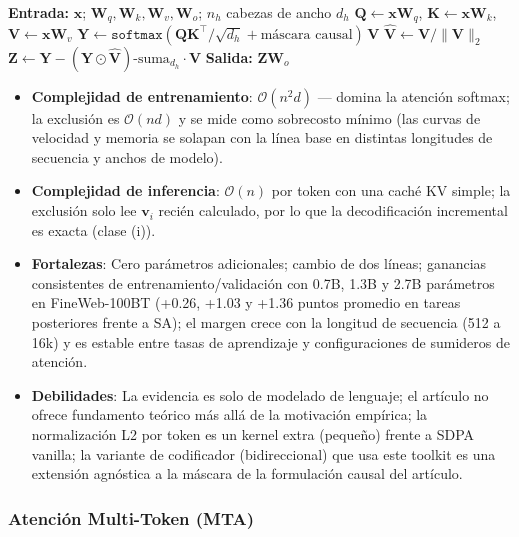 \begin{algorithmic}[1]
\State \textbf{Entrada:} $\mathbf{x}$; $\mathbf{W}_q,\mathbf{W}_k,\mathbf{W}_v,\mathbf{W}_o$; $n_h$ cabezas de ancho $d_h$
\State $\mathbf{Q}\gets\mathbf{x}\mathbf{W}_q$, $\mathbf{K}\gets\mathbf{x}\mathbf{W}_k$, $\mathbf{V}\gets\mathbf{x}\mathbf{W}_v$ 
\State $\mathbf{Y} \gets \texttt{softmax}(\mathbf{Q}\mathbf{K}^\top/\sqrt{d_h} + \text{máscara causal})\,\mathbf{V}$ 
\State $\hat{\mathbf{V}} \gets \mathbf{V} / \|\mathbf{V}\|_2$ 
\State $\mathbf{Z} \gets \mathbf{Y} - (\mathbf{Y}\odot\hat{\mathbf{V}})\text{-suma}_{d_h}\cdot\hat{\mathbf{V}}$ 
\State \textbf{Salida:} $\mathbf{Z}\mathbf{W}_o$
\end{algorithmic}

\begin{itemize}[leftmargin=*]
    \item \textbf{Complejidad de entrenamiento}: $\mathcal{O}(n^2 d)$ --- domina la atención softmax; la exclusión es $\mathcal{O}(nd)$ y se mide como sobrecosto mínimo (las curvas de velocidad y memoria se solapan con la línea base en distintas longitudes de secuencia y anchos de modelo).
    \item \textbf{Complejidad de inferencia}: $\mathcal{O}(n)$ por token con una caché KV simple; la exclusión solo lee $\mathbf{v}_i$ recién calculado, por lo que la decodificación incremental es exacta (clase (i)).
    \item \textbf{Fortalezas}: Cero parámetros adicionales; cambio de dos líneas; ganancias consistentes de entrenamiento/validación con 0.7B, 1.3B y 2.7B parámetros en FineWeb-100BT (+0.26, +1.03 y +1.36 puntos promedio en tareas posteriores frente a SA); el margen crece con la longitud de secuencia (512 a 16k) y es estable entre tasas de aprendizaje y configuraciones de sumideros de atención.
    \item \textbf{Debilidades}: La evidencia es solo de modelado de lenguaje; el artículo no ofrece fundamento teórico más allá de la motivación empírica; la normalización L2 por token es un kernel extra (pequeño) frente a SDPA vanilla; la variante de codificador (bidireccional) que usa este toolkit es una extensión agnóstica a la máscara de la formulación causal del artículo.
\end{itemize}

\subsubsection{Atención Multi-Token (MTA)}

